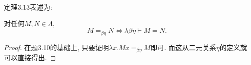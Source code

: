 定理3.13表述为:

对任何$M,N\in\Lambda$,$$M=_{\beta\eta} N\Leftrightarrow \lambda\beta\eta\vdash M=N.$$
\begin{proof}
    在题3.10的基础上, 只要证明$\lambda x.Mx=_{\beta\eta} M$即可. 而这从二元关系$\eta$的定义就可以直接得出.
\end{proof}
